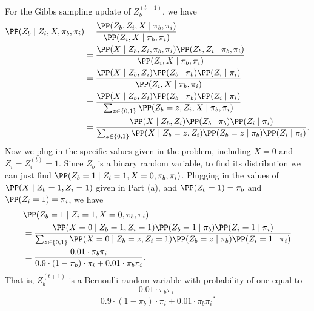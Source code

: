 \documentclass[a4paper,twoside,11pt]{article}
\begin{document}
\begin{parts}
        \begin{solution}
        For the Gibbs sampling update of $Z_b^{(t + 1)}$, we have
        \begin{align*}
            \PP(Z_b \mid Z_i, X, \pi_b, \pi_i) & = \frac{\PP(Z_b, Z_i, X \mid \pi_b, \pi_i)}{\PP(Z_i, X \mid \pi_b, \pi_i)} \\
            & = \frac{\PP(X \mid Z_b, Z_i, \pi_b, \pi_i) \PP(Z_b, Z_i \mid \pi_b, \pi_i)}{\PP(Z_i, X \mid \pi_b, \pi_i)} \\
            & = \frac{\PP(X \mid Z_b, Z_i) \PP(Z_b \mid \pi_b) \PP(Z_i \mid \pi_i)}{\PP(Z_i, X \mid \pi_b, \pi_i)} \\
            & = \frac{\PP(X \mid Z_b, Z_i) \PP(Z_b \mid \pi_b) \PP(Z_i \mid \pi_i)}{\sum_{z \in \{0, 1\}} \PP(Z_b=z, Z_i, X \mid \pi_b, \pi_i)} \\
            & = \frac{\PP(X \mid Z_b, Z_i) \PP(Z_b \mid \pi_b) \PP(Z_i \mid \pi_i)}{\sum_{z \in \{0, 1\}}\PP(X \mid Z_b=z, Z_i) \PP(Z_b=z \mid \pi_b)\PP(Z_i \mid \pi_i)}.
        \end{align*}
        Now we plug in the specific values given in the problem, including $X = 0$ and $Z_i = Z_i^{(t)} = 1$. Since $Z_b$ is a binary random variable, to find its distribution we can just find $\PP(Z_b = 1 \mid Z_i = 1, X = 0, \pi_b, \pi_i)$. Plugging in the values of $\PP(X \mid Z_b = 1, Z_i = 1)$ given in Part (a), and $\PP(Z_b = 1) = \pi_b$
        and $\PP(Z_i = 1) = \pi_i$, we have
         {
        \begin{align*}
            & \PP(Z_b = 1 \mid Z_i = 1, X = 0, \pi_b, \pi_i) \\
            & = \frac{\PP(X = 0\mid Z_b = 1, Z_i = 1) \PP(Z_b = 1 \mid \pi_b) \PP(Z_i = 1 \mid \pi_i)}{\sum_{z \in \{0, 1\}}\PP(X = 0\mid Z_b=z, Z_i = 1) \PP(Z_b=z \mid \pi_b)\PP(Z_i =1\mid \pi_i)} \\  
            & = \frac{0.01 \cdot \pi_b \pi_i}{0.9 \cdot (1 -\pi_b) \cdot \pi_i + 0.01 \cdot \pi_b \pi_i}.
        \end{align*}
        That is, $Z_b^{(t + 1)}$ is a Bernoulli random variable with probability of one equal to
        $$
        \frac{0.01 \cdot \pi_b \pi_i}{0.9 \cdot (1 -\pi_b) \cdot \pi_i + 0.01 \cdot \pi_b \pi_i}.
        $$
        }{
        }
\end{solution}
\end{parts}
\end{document}
